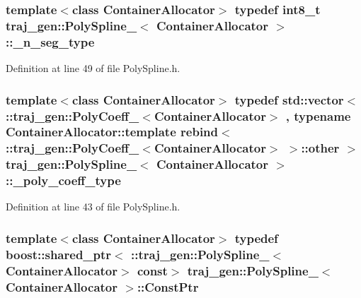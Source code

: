 \subsubsection[{\texorpdfstring{\+\_\+n\+\_\+seg\+\_\+type}{_n_seg_type}}]{\setlength{\rightskip}{0pt plus 5cm}template$<$class Container\+Allocator$>$ typedef int8\+\_\+t {\bf traj\+\_\+gen\+::\+Poly\+Spline\+\_\+}$<$ Container\+Allocator $>$\+::{\bf \+\_\+n\+\_\+seg\+\_\+type}}\hypertarget{structtraj__gen_1_1_poly_spline___af986120ad67cf19dd0405f94fca0f965}{}\label{structtraj__gen_1_1_poly_spline___af986120ad67cf19dd0405f94fca0f965}


Definition at line 49 of file Poly\+Spline.\+h.

\subsubsection[{\texorpdfstring{\+\_\+poly\+\_\+coeff\+\_\+type}{_poly_coeff_type}}]{\setlength{\rightskip}{0pt plus 5cm}template$<$class Container\+Allocator$>$ typedef std\+::vector$<$ \+::{\bf traj\+\_\+gen\+::\+Poly\+Coeff\+\_\+}$<$Container\+Allocator$>$ , typename Container\+Allocator\+::template rebind$<$ \+::{\bf traj\+\_\+gen\+::\+Poly\+Coeff\+\_\+}$<$Container\+Allocator$>$ $>$\+::other $>$ {\bf traj\+\_\+gen\+::\+Poly\+Spline\+\_\+}$<$ Container\+Allocator $>$\+::{\bf \+\_\+poly\+\_\+coeff\+\_\+type}}\hypertarget{structtraj__gen_1_1_poly_spline___a023653ddcbaae9497c397e82ffd22217}{}\label{structtraj__gen_1_1_poly_spline___a023653ddcbaae9497c397e82ffd22217}


Definition at line 43 of file Poly\+Spline.\+h.

\subsubsection[{\texorpdfstring{Const\+Ptr}{ConstPtr}}]{\setlength{\rightskip}{0pt plus 5cm}template$<$class Container\+Allocator$>$ typedef boost\+::shared\+\_\+ptr$<$ \+::{\bf traj\+\_\+gen\+::\+Poly\+Spline\+\_\+}$<$Container\+Allocator$>$ const$>$ {\bf traj\+\_\+gen\+::\+Poly\+Spline\+\_\+}$<$ Container\+Allocator $>$\+::{\bf Const\+Ptr}}\hypertarget{structtraj__gen_1_1_poly_spline___ad52aa70cb633c91c0052311566e5fe56}{}\label{structtraj__gen_1_1_poly_spline___ad52aa70cb633c91c0052311566e5fe56}


